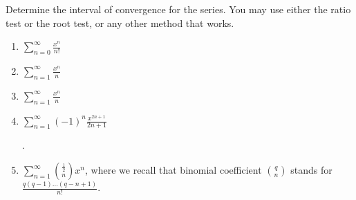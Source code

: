 Determine the interval of convergence for the series. You may use either the ratio test or the root test, or any other method that works.

\begin{multicols}{2}
\begin{enumerate}
\item 
$\displaystyle \sum\limits_{n=0}^{\infty} \frac{x^n}{n!}$

\item 
$\displaystyle \sum\limits_{n=1}^{\infty} \frac{x^n}{n} $

\item 
$\displaystyle \sum\limits_{n=1}^{\infty} \frac{x^n}{n}$
\answer{converges for $|x|\in[-1,1)$.}
\item 
$\displaystyle\sum\limits_{n=1}^{\infty} (-1)^n\frac{x^{2n+1}}{2n+1}$

\answer{converges for $|x|\in (-1, 1]$}.
\item 
$\displaystyle \sum\limits_{n=1}^{\infty} \binom{\frac{1}{2}}{n}x^{n}$, where we recall that binomial coefficient $\displaystyle \binom{q}{n}$ stands for $\displaystyle\frac{q (q-1)\dots (q-n+1)}{n!}$.
\answer{converges for $x\in (-1,1]$. } 
\end{enumerate}
\end{multicols}